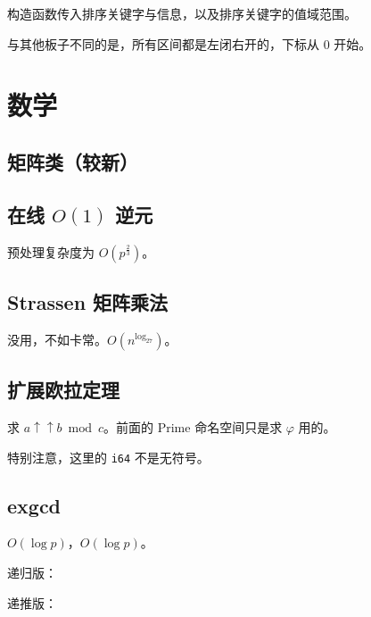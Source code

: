 \documentclass[12pt]{ctexart}
\begin{document}
构造函数传入排序关键字与信息，以及排序关键字的值域范围。

与其他板子不同的是，所有区间都是左闭右开的，下标从 $0$ 开始。


\newpage

\section{数学}


\subsection{矩阵类（较新）}




\subsection{在线 $O(1)$ 逆元}

预处理复杂度为 $O(p^{\frac{2}{3}})$。



\subsection{Strassen 矩阵乘法}

没用，不如卡常。$O(n^{\log_27})$。



\subsection{扩展欧拉定理}

求 $a\uparrow\uparrow b \bmod c$。前面的 Prime 命名空间只是求 $\varphi$ 用的。

特别注意，这里的 \verb|i64| 不是无符号。



\subsection{exgcd}

$O(\log p)$，$O(\log p)$。

递归版：



递推版：
\end{document}
